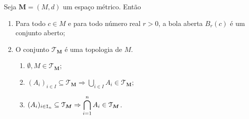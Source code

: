 \begin{prop}
	Seja $\bm M = (M,d)$ um espaço métrico. Então
	\begin{enumerate}
	\item Para todo $c \in M$ e para todo número real $r > 0$, a bola aberta $B_r(c)$ é um conjunto aberto;
	\item O conjunto $\mathcal T_{\bm M}$ é uma topologia de $M$.
		\begin{enumerate}
			\item $\emptyset,M \in \mathcal T_{\bm M}$;
			\item $(A_i)_{i \in I} \subseteq \mathcal T_{\bm M} \Rightarrow \displaystyle\bigcup_{i \in I} A_i \in \mathcal T_{\bm M}$;
			\item $(A_i)_{i \in \mathtt I_n} \subseteq \mathcal T_{\bm M} \Rightarrow \displaystyle\bigcap_{i=1}^n A_i \in \mathcal T_{\bm M}$.
		\end{enumerate}
	\end{enumerate}
\end{prop}
